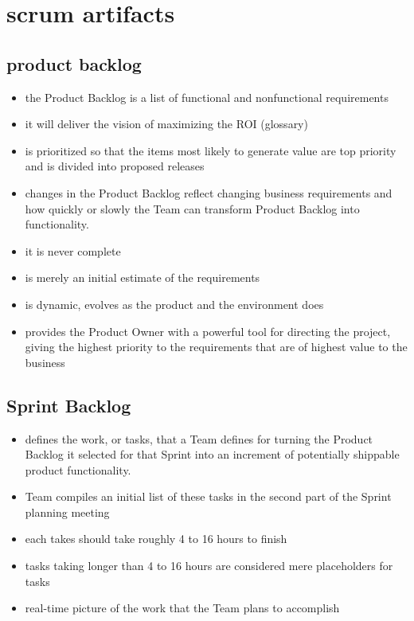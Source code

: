 \section{scrum artifacts}

\subsection{product backlog}
\begin{itemize}
  \item the Product Backlog is a list of functional and nonfunctional requirements
  \item it will deliver the vision of maximizing the ROI (glossary)
  \item is prioritized so that the items most likely to generate value are top priority and is divided into proposed releases
  \item changes in the Product Backlog reflect changing business requirements and how quickly or slowly the Team can transform Product Backlog into functionality.
  \item it is never complete
  \item is merely an initial estimate of the requirements
  \item is dynamic, evolves as the product and the environment does
  \item provides the Product Owner with a powerful tool for directing the project, giving the highest priority to the requirements that are of highest value to the business
\end{itemize}


\subsection{Sprint Backlog}
\begin{itemize}
  \item defines the work, or tasks, that a Team defines for turning the Product Backlog it selected for that Sprint into an increment of potentially shippable product functionality.
  \item Team compiles an initial list of these tasks in the second part of the Sprint planning meeting
  \item each takes should take roughly 4 to 16 hours to finish
  \item tasks taking longer than 4 to 16 hours are considered mere placeholders for tasks
  \item real-time picture of the work that the Team plans to accomplish
\end{itemize}


